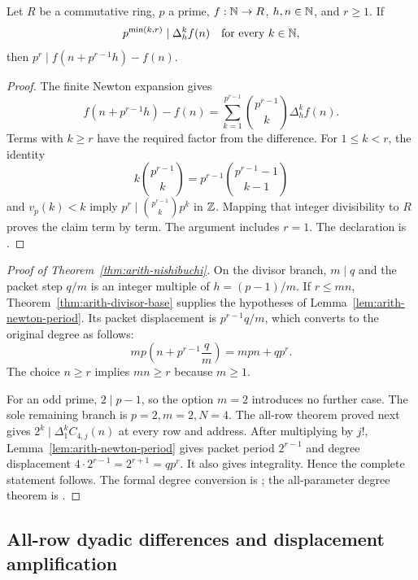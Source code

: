 \begin{lemma}
\label{lem:arith-newton-period}
Let $R$ be a commutative ring, $p$ a prime, $f:\mathbb N\to R$, $h,n\in\mathbb N$,
and $r\ge1$.  If
\[
 p^{\min(k,r)}\mid\Delta_h^k f(n)\quad\text{for every }k\in\mathbb N,
\]
then $p^r\mid f(n+p^{r-1}h)-f(n)$.
\end{lemma}

\begin{proof}
The finite Newton expansion gives
\[
 f(n+p^{r-1}h)-f(n)
 =\sum_{k=1}^{p^{r-1}}\binom{p^{r-1}}k\Delta_h^k f(n).
\]
Terms with $k\ge r$ have the required factor from the difference.
For $1\le k<r$, the identity
\[
 k\binom{p^{r-1}}k=p^{r-1}\binom{p^{r-1}-1}{k-1}
\]
and $v_p(k)<k$ imply
$p^r\mid\binom{p^{r-1}}k p^k$ in $\mathbb Z$.
Mapping that integer divisibility to $R$ proves the claim term by term.
The argument includes $r=1$.
The declaration is
.
\end{proof}

\begin{proof}[Proof of Theorem~\ref{thm:arith-nishibuchi}]
On the divisor branch, $m\mid q$ and the packet step $q/m$ is an integer
multiple of $h=(p-1)/m$.  If $r\le mn$, Theorem~\ref{thm:arith-divisor-base}
supplies the hypotheses of Lemma~\ref{lem:arith-newton-period}.
Its packet displacement is $p^{r-1}q/m$, which converts to the original
degree as follows:
\[
 mp\left(n+p^{r-1}\frac qm\right)=mpn+qp^r.
\]
The choice $n\ge r$ implies $mn\ge r$ because $m\ge1$.

For an odd prime, $2\mid p-1$, so the option $m=2$ introduces no further
case.  The sole remaining branch is $p=2,m=2,N=4$.  The all-row theorem
proved next gives $2^k\mid\Delta_1^kC_{4,j}(n)$ at every row and address.
After multiplying by $j!$, Lemma~\ref{lem:arith-newton-period} gives packet
period $2^{r-1}$ and degree displacement $4\cdot2^{r-1}=2^{r+1}=qp^r$.
It also gives integrality.  Hence the complete statement follows.
The formal degree conversion is
;
the all-parameter degree theorem is
.
\end{proof}

\subsection{All-row dyadic differences and displacement amplification}

